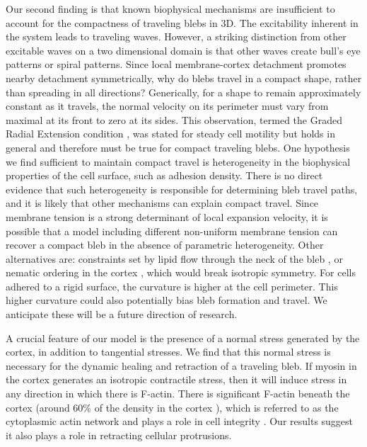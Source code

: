Our second finding is that known biophysical mechanisms are insufficient to account for the compactness of traveling blebs in 3D. The excitability inherent in the system leads to traveling waves. However, a striking distinction from other excitable waves on a two dimensional domain is that other waves create bull's eye patterns or spiral patterns. Since local membrane-cortex detachment promotes nearby detachment symmetrically, why do blebs travel in a compact shape, rather than spreading in all directions? Generically, for a shape to remain approximately constant as it travels, the normal velocity on its perimeter must vary from maximal at its front to zero at its sides. This observation, termed the Graded Radial Extension condition \cite{Lee:1993bt}, was stated for steady cell motility but holds in general and therefore must be true for compact traveling blebs. One hypothesis we find sufficient to maintain compact travel is heterogeneity in the biophysical properties of the cell surface, such as adhesion density. There is no direct evidence that such heterogeneity is responsible for determining bleb travel paths, and it is likely that other mechanisms can explain compact travel. Since membrane tension is a strong determinant of local expansion velocity, it is possible that a model including different non-uniform membrane tension can recover a compact bleb in the absence of parametric heterogeneity. Other alternatives are: constraints set by lipid flow through the neck of the bleb \cite{Rangamani:2013ce}, or nematic ordering in the cortex \cite{Kapustina:2013gc}, which would break isotropic symmetry. For cells adhered to a rigid surface, the curvature is higher at the cell perimeter. This higher curvature could also potentially bias bleb formation and travel. We anticipate these will be a future direction of research. 




A crucial feature of our model is the presence of a normal stress generated by the cortex, in addition to tangential stresses. We find that this normal stress is necessary for the dynamic healing and retraction of a traveling bleb. If myosin in the cortex generates an isotropic contractile stress, then it will induce stress in any direction in which there is F-actin. There is significant F-actin beneath the cortex (around 60\% of the density in the cortex \cite{Moeendarbary:2013bs,Clark:2013ef}), which is referred to as the cytoplasmic actin network and plays a role in cell integrity \cite{Luo:2013}. Our results suggest it also plays a role in retracting cellular protrusions.


